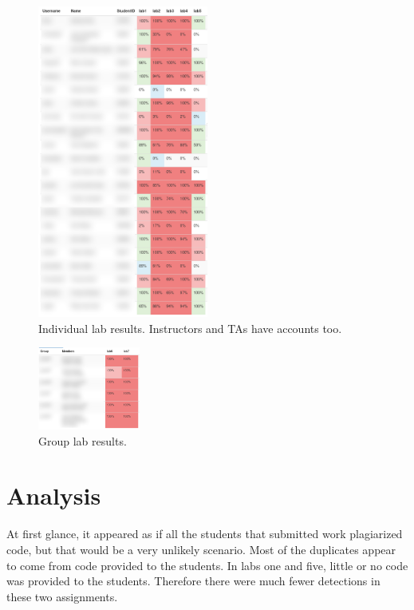 \documentclass[10pt,journal,compsoc]{IEEEtran}
\begin{document}
		\begin{figure}[h!]
			\includegraphics[width=0.5\textwidth]{indlabresults.png}
			\caption{Individual lab results. Instructors and TAs have accounts too.}
			\label{fig:indlabresults}
		\end{figure}
		
		\begin{figure}[h!]
			\includegraphics[width=0.3\textwidth]{grouplabresults.png}
			\caption{Group lab results.}
			\label{fig:grouplabresults}
		\end{figure}
	
	\section{Analysis}
	At first glance, it appeared as if all the students that submitted work plagiarized code, but that would be a very unlikely scenario. Most of the duplicates appear to come from code provided to the students. In labs one and five, little or no code was provided to the students. Therefore there were much fewer detections in these two assignments.
	
\end{document}
